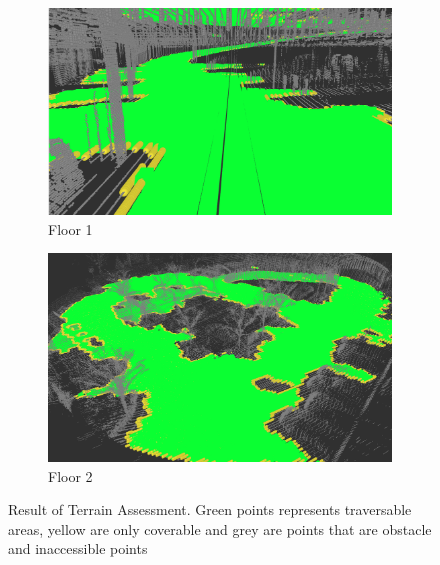 \begin{figure}
\centering
    \begin{subfigure}{.49\textwidth}
    \centering
    \includegraphics[width=\textwidth]{figures/terrainassessmentresult-floor1.png}
    \caption{Floor 1}
    \end{subfigure}
    \begin{subfigure}{.49\textwidth}
    \centering
    \includegraphics[width=\textwidth]{figures/terrainassessment-floor2'.png}
    \caption{Floor 2}
    
    \end{subfigure}
    
    \caption{Result of Terrain Assessment. Green points represents traversable areas, yellow are only coverable and grey are points that are obstacle and inaccessible points}
    \label{fig:terrainassessment}
\end{figure}


